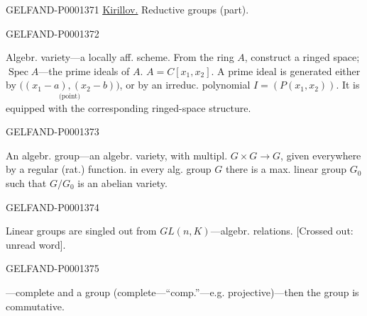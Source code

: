\begin{GelfandAdjacentEvidence}{GELFAND-P000137}{1}
\underline{\underline{Kirillov.}}  Reductive groups (part).
\end{GelfandAdjacentEvidence}
\begin{GelfandAdjacentEvidence}{GELFAND-P000137}{2}

Algebr. variety—a locally aff. scheme. From the ring $A$, construct a ringed space; $\operatorname{Spec}A$—the prime ideals of $A$.
$A=C[x_1, x_2]$. A prime ideal is generated either by $\underset{\text{(point)}}{\bigl ((x_1-a),(x_2-b)\bigr)}$, or by an irreduc. polynomial $I=(P (x_1, x_2))$. It is equipped with the corresponding ringed-space structure.
\end{GelfandAdjacentEvidence}
\begin{GelfandAdjacentEvidence}{GELFAND-P000137}{3}


An algebr. group—an algebr. variety, with multipl. $G\times G\to G$, given everywhere by a regular (rat.) function.
 in every alg. group $G$ there is a max. linear group $G_0$ such that $G/G_0$ is an abelian variety.
\end{GelfandAdjacentEvidence}
\begin{GelfandAdjacentEvidence}{GELFAND-P000137}{4}

Linear groups are singled out from $GL (n, K)$—algebr. relations. [Crossed out: unread word].
\end{GelfandAdjacentEvidence}
\begin{GelfandAdjacentEvidence}{GELFAND-P000137}{5}


 —complete and a group (complete—“comp.”—e.g. projective)—then the group is commutative.
\end{GelfandAdjacentEvidence}
